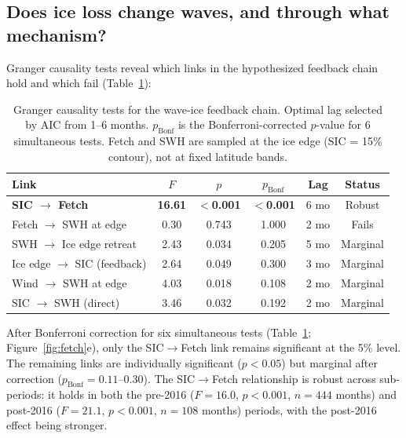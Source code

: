 \documentclass[11pt]{article}
\begin{document}

\subsection{Does ice loss change waves, and through what mechanism?}

Granger causality tests reveal which links in the hypothesized feedback chain hold and which fail (Table~\ref{tab:granger}):

\begin{table}[htbp]
\centering
\caption{Granger causality tests for the wave-ice feedback chain. Optimal lag selected by AIC from 1--6 months. $p_{\mathrm{Bonf}}$ is the Bonferroni-corrected $p$-value for 6 simultaneous tests. Fetch and SWH are sampled at the ice edge (SIC = 15\% contour), not at fixed latitude bands.}
\label{tab:granger}
\begin{tabular}{lccccc}
\hline
Link & $F$ & $p$ & $p_{\mathrm{Bonf}}$ & Lag & Status \\
\hline
\textbf{SIC $\to$ Fetch} & \textbf{16.61} & \textbf{$<$0.001} & \textbf{$<$0.001} & 6 mo & Robust \\
Fetch $\to$ SWH at edge & 0.30 & 0.743 & 1.000 & 2 mo & Fails \\
SWH $\to$ Ice edge retreat & 2.43 & 0.034 & 0.205 & 5 mo & Marginal \\
Ice edge $\to$ SIC (feedback) & 2.64 & 0.049 & 0.300 & 3 mo & Marginal \\
Wind $\to$ SWH at edge & 4.03 & 0.018 & 0.108 & 2 mo & Marginal \\
SIC $\to$ SWH (direct) & 3.46 & 0.032 & 0.192 & 2 mo & Marginal \\
\hline
\end{tabular}
\end{table}

After Bonferroni correction for six simultaneous tests (Table~\ref{tab:granger}; Figure~\ref{fig:fetch}e), only the SIC$\to$Fetch link remains significant at the 5\% level. The remaining links are individually significant ($p < 0.05$) but marginal after correction ($p_{\mathrm{Bonf}} = 0.11$--$0.30$). The SIC$\to$Fetch relationship is robust across sub-periods: it holds in both the pre-2016 ($F = 16.0$, $p < 0.001$, $n = 444$ months) and post-2016 ($F = 21.1$, $p < 0.001$, $n = 108$ months) periods, with the post-2016 effect being stronger.
\end{document}
